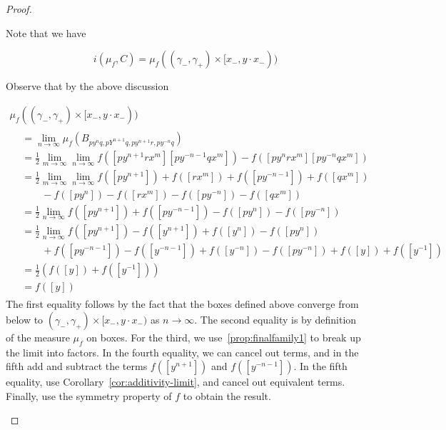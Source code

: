 \begin{proof}
\begin{enumerate}

       
       \begin{figure}
\end{figure}
       

       
       

    
    Note that we have
    
    \[
       i(\mu_f,C) = \mu_f((\gamma_-,\gamma_+) \times [x_-,y \cdot x_-))
    \] 
    
    Observe that by the above discussion
    
    \begin{multline*}
      \mu_f((\gamma_-,\gamma_+) \times [x_-,y \cdot x_-)) \\
      \begin{aligned}
    &= \lim_{n\to\infty} \mu_f(B_{py^nq, pY^{n+1}q,py^{n+1}r,py^{-n}q})  \\
    &= \frac{1}{2}\lim_{m\to\infty} \lim_{n\to\infty}f([py^{n+1}rx^{m}][py^{-n-1}qx^{m}])-f([py^{n}rx^{m}][py^{-n}qx^{m}]) \\
    &= \frac{1}{2}\lim_{m\to\infty} \lim_{n\to\infty}f([py^{n+1}]) + f([rx^{m}]) + f([py^{-n-1}]) + f([qx^{m}])\\
    &\qquad-f([py^{n}]) - f([rx^{m}]) - f([py^{-n}]) - f([qx^{m}]) \\
    &= \frac{1}{2} \lim_{n\to\infty}f([py^{n+1}]) +  f([py^{-n-1}]) -f([py^{n}]) - f([py^{-n}])  \\
    &= \frac{1}{2} \lim_{n\to\infty}f([py^{n+1}]) - f([y^{n+1}]) + f([y^{n}]) -f([py^{n}]) \\
    &\qquad+ f([py^{-n-1}]) - f([y^{-n-1}]) + f([y^{-n}]) - f([py^{-n}])  + f([y]) + f([y^{-1}])\\
    &= \frac{1}{2}(f([y]) + f([y^{-1}]))\\
    &=f([y])
      \end{aligned}
    \end{multline*}
      The first equality follows by the fact that the boxes defined above converge from below to $(\gamma_-,\gamma_+) \times [x_-,y \cdot x_-)$ as $n \to \infty$. The second equality is by definition of the measure $\mu_f$ on boxes.
      For the third, we use~\ref{prop:finalfamily1} to break up the limit into factors. In the fourth equality, we can cancel out terms, and in the fifth add and subtract the terms $f([y^{n+1}])$ and $f([y^{-n-1}])$. In the fifth equality, use Corollary~\ref{cor:additivity-limit}, and cancel out equivalent terms. Finally, use the symmetry property of $f$ to obtain the result.
    \end{enumerate}
\end{proof}



